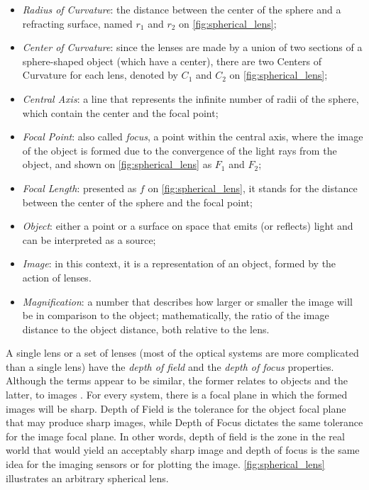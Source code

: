 \begin{itemize}
    \item \emph{Radius of Curvature}: the distance between the center of the sphere and a refracting surface, named $\mathit{r_{1}}$ and $\mathit{r_{2}}$ on \autoref{fig:spherical_lens};
    
    \item \emph{Center of Curvature}: since the lenses are made by a union of two sections of a sphere-shaped object (which have a center), there are two Centers of Curvature for each lens, denoted by $\mathit{C_{1}}$ and $\mathit{C_{2}}$ on \autoref{fig:spherical_lens};
    
    \item \emph{Central Axis}: a line that represents the infinite number of radii of the sphere, which contain the center and the focal point;
    
    \item \emph{Focal Point}: also called \emph{focus}, a point within the central axis, where the image of the object is formed due to the convergence of the light rays from the object, and shown on \autoref{fig:spherical_lens} as $\mathit{F_{1}}$ and $\mathit{F_{2}}$;
    
    \item \emph{Focal Length}: presented as $\mathit{f}$ on \autoref{fig:spherical_lens}, it stands for the distance between the center of the sphere and the focal point;
    
    \item \emph{Object}: either a point or a surface on space that emits (or reflects) light and can be interpreted as a source;
    
    \item \emph{Image}: in this context, it is a representation of an object, formed by the action of lenses.
    
    \item \emph{Magnification}: a number that describes how larger or smaller the image will be in comparison to the object; mathematically, the ratio of the image distance to the object distance, both relative to the lens.
    
\end{itemize}

A single lens or a set of lenses (most of the optical systems are more complicated than a single lens) have the \emph{depth of field} and the \emph{depth of focus} properties. Although the terms appear to be similar, the former relates to objects and the latter, to images \cite{davidson2002optical}. For every system, there is a focal plane in which the formed images will be sharp. Depth of Field is the tolerance for the object focal plane that may produce sharp images, while Depth of Focus dictates the same tolerance for the image focal plane. In other words, depth of field is the zone in the real world that would yield an acceptably sharp image and depth of focus is the same idea for the imaging sensors or for plotting the image. \autoref{fig:spherical_lens} illustrates an arbitrary spherical lens.

